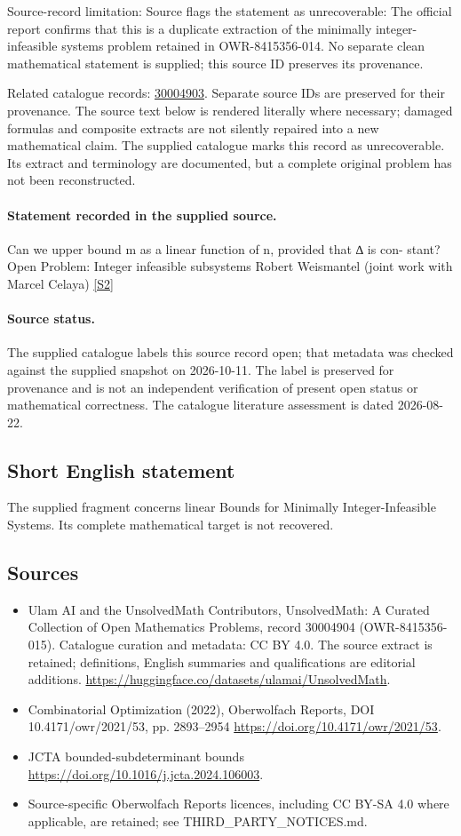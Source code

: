 \documentclass[11pt]{article}
\begin{document}
Source-record limitation: Source flags the statement as unrecoverable: The official report confirms that this is a duplicate extraction of the minimally integer-infeasible systems problem retained in OWR-8415356-014. No separate clean mathematical statement is supplied; this source ID preserves its provenance.

Related catalogue records: \href{https://mehmetmars7.github.io/Erdosproblems-llm-hunter/problem.html?type=open_problems&id=30004903}{30004903}. Separate source IDs are preserved for their provenance.
The source text below is rendered literally where necessary; damaged formulas and composite extracts are not silently repaired into a new mathematical claim.
The supplied catalogue marks this record as unrecoverable. Its extract and terminology are documented, but a complete original problem has not been reconstructed.
\paragraph{Statement recorded in the supplied source.}
Can we upper bound m as a linear function of n, provided that ∆ is con- stant? Open Problem: Integer infeasible subsystems Robert Weismantel (joint work with Marcel Celaya) \href{https://doi.org/10.4171/owr/2021/53}{[S2]}
\paragraph{Source status.}
The supplied catalogue labels this source record open; that metadata was checked against the supplied snapshot on 2026-10-11. The label is preserved for provenance and is not an independent verification of present open status or mathematical correctness. The catalogue literature assessment is dated 2026-08-22.
\subsection{Short English statement}
The supplied fragment concerns linear Bounds for Minimally Integer-Infeasible Systems. Its complete mathematical target is not recovered.
\subsection{Sources}
\begin{itemize}
\item[S1] Ulam AI and the UnsolvedMath Contributors, UnsolvedMath: A Curated Collection of Open Mathematics Problems, record 30004904 (OWR-8415356-015). Catalogue curation and metadata: CC BY 4.0. The source extract is retained; definitions, English summaries and qualifications are editorial additions.
\url{https://huggingface.co/datasets/ulamai/UnsolvedMath}.
\item[S2] Combinatorial Optimization (2022), Oberwolfach Reports, DOI 10.4171/owr/2021/53, pp. 2893--2954
\url{https://doi.org/10.4171/owr/2021/53}.
\item[S3] JCTA bounded-subdeterminant bounds
\url{https://doi.org/10.1016/j.jcta.2024.106003}.
\item Source-specific Oberwolfach Reports licences, including CC BY-SA 4.0 where applicable, are retained; see THIRD\_PARTY\_NOTICES.md.
\end{itemize}
\end{document}
